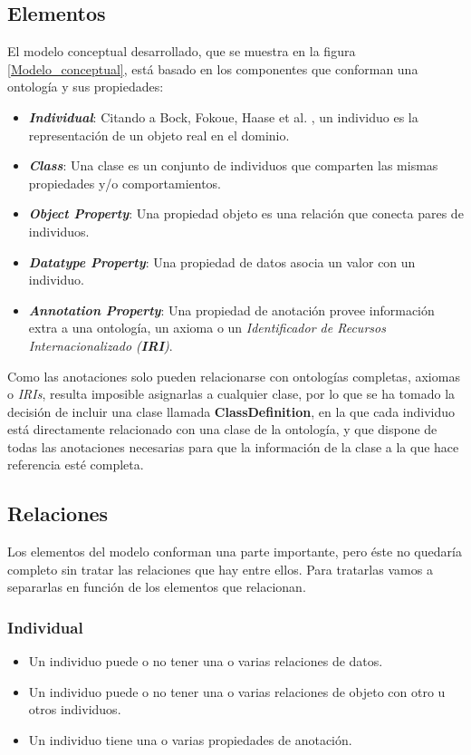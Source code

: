\subsection{Elementos}
El modelo conceptual desarrollado, que se muestra en la figura \ref{Modelo_conceptual}, está basado en los componentes 
que conforman una ontología y sus propiedades:
\begin{itemize}
    \item \textit{\textbf{Individual}}: Citando a Bock, Fokoue, Haase et al. \autocite*{Bock2012}, un individuo es la 
    representación de un objeto real en el dominio.
    \item \textit{\textbf{Class}}: Una clase es un conjunto de individuos que comparten las mismas propiedades y/o 
    comportamientos.
    \item \textit{\textbf{Object Property}}: Una propiedad objeto es una relación que conecta pares de individuos.
    \item \textit{\textbf{Datatype Property}}: Una propiedad de datos asocia un valor con un individuo.
    \item \textit{\textbf{Annotation Property}}: Una propiedad de anotación provee información extra a una ontología, un axioma 
    o un \textit{Identificador de Recursos Internacionalizado (\textbf{IRI})}.
\end{itemize}

Como las anotaciones solo pueden relacionarse con ontologías completas, axiomas o \textit{IRIs}, resulta imposible asignarlas a cualquier clase, 
por lo que se ha tomado la decisión de incluir una clase llamada \textbf{ClassDefinition}, en la que cada individuo está 
directamente relacionado con una clase de la ontología, y que dispone de todas las anotaciones necesarias para que la información 
de la clase a la que hace referencia esté completa. 

\subsection{Relaciones}
Los elementos del modelo conforman una parte importante, pero éste no quedaría completo sin tratar las relaciones que hay entre 
ellos. Para tratarlas vamos a separarlas en función de los elementos que relacionan.
\subsubsection{Individual}
\begin{itemize}
    \item Un individuo puede o no tener una o varias relaciones de datos.
    \item Un individuo puede o no tener una o varias relaciones de objeto con otro u otros individuos.
    \item Un individuo tiene una o varias propiedades de anotación.
\end{itemize}

